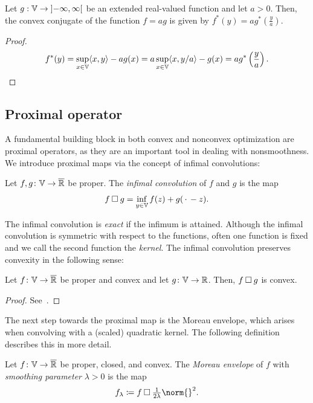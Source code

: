 \begin{theorem}%
	\label{th:convex conjugate under postitive scaling}
	Let \(g: \V \to \ointerval{-\infty}{\infty} \) be an extended real-valued function and let \( a > \num{0} \).
	Then, the convex conjugate of the function \( f = ag \) is given by \(f^\ast(y)=ag^\ast\left(\frac{y}{a}\right)\).
\end{theorem}
\begin{proof}
	\begin{equation}
		f^\ast(y)=\sup_{x\in\mathbb{V}}\langle x, y \rangle-ag(x)=a\sup_{x\in\mathbb{V}}\langle x, y/a \rangle-g(x)=ag^\ast\left(\frac{y}{a}\right).
	\end{equation}
\end{proof}
\subsection{Proximal operator}
A fundamental building block in both convex and nonconvex optimization are proximal operators, as they are an important tool in dealing with nonsmoothness.
We introduce proximal maps via the concept of infimal convolutions:
\begin{definition}%
	\label{def:infimal convolution}
	Let \( f, g \colon \mathbb{V} \to \overline{\mathbb{R}} \) be proper.
	The \emph{infimal convolution} of \( f \) and \( g \) is the map
	\[
		f\mathbin{\square}g = \inf_{y \in \mathbb{V}} f(z) + g(\,\cdot\, - z).
	\]
\end{definition}
The infimal convolution is \emph{exact} if the infimum is attained.
Although the infimal convolution is symmetric with respect to the functions, often one function is fixed and we call the second function the \emph{kernel}.
The infimal convolution preserves convexity in the following sense:
\begin{theorem}
	Let \( f \colon \mathbb{V} \to \overline{\mathbb{R}} \) be proper and convex and let \( g \colon \mathbb{V} \to \mathbb{R} \).
	Then, \( f\mathbin{\square}g \) is convex.
\end{theorem}
\begin{proof}
	See~\cite[theorem 2.19]{beck_firstorder_2017}.
\end{proof}
The next step towards the proximal map is the Moreau envelope, which arises when convolving with a (scaled) quadratic kernel.
The following definition describes this in more detail.
\begin{definition}
	\label{def:moreau envelope}
	Let \( f \colon \mathbb{V} \to \overline{\mathbb{R}} \) be proper, closed, and convex.
	The \emph{Moreau envelope} of \( f \) with \emph{smoothing parameter} \( \lambda > \num{0} \) is the map
	\[
		\Moreau{f} \coloneqq \InfConv{f}{\tfrac{1}{2\lambda}\norm{}^{\num{2}}}.
	\]
\end{definition}
